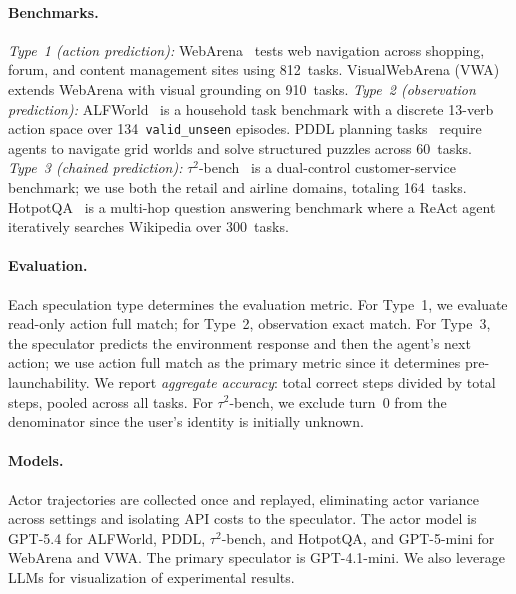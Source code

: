 \documentclass{article}
\begin{document}
\paragraph{Benchmarks.}
\emph{Type~1 (action prediction):} WebArena~\citep{zhou2024webarena} tests web navigation across shopping, forum, and content management sites using 812~tasks. VisualWebArena (VWA)~\citep{koh2024vwa} extends WebArena with visual grounding on 910~tasks. \emph{Type~2 (observation prediction):} ALFWorld~\citep{shridhar2021alfworld} is a household task benchmark with a discrete 13-verb action space over 134~\texttt{valid\_unseen} episodes. PDDL planning tasks~\citep{vallati2015ipc,ma2024agentboard} require agents to navigate grid worlds and solve structured puzzles across 60~tasks. \emph{Type~3 (chained prediction):} $\tau^{2}$-bench~\citep{barres2025tau2} is a dual-control customer-service benchmark; we use both the retail and airline domains, totaling 164~tasks. HotpotQA~\citep{yang2018hotpotqa} is a multi-hop question answering benchmark where a ReAct agent~\citep{yao2023react} iteratively searches Wikipedia over 300~tasks.

\paragraph{Evaluation.}
Each speculation type determines the evaluation metric. For Type~1, we evaluate read-only action full match; for Type~2, observation exact match. For Type~3, the speculator predicts the environment response and then the agent's next action; we use action full match as the primary metric since it determines pre-launchability. We report \emph{aggregate accuracy}: total correct steps divided by total steps, pooled across all tasks. For $\tau^{2}$-bench, we exclude turn~0 from the denominator since the user's identity is initially unknown.

\paragraph{Models.}
Actor trajectories are collected once and replayed, eliminating actor variance across settings and isolating API costs to the speculator. The actor model is GPT-5.4 for ALFWorld, PDDL, $\tau^{2}$-bench, and HotpotQA, and GPT-5-mini for WebArena and VWA. The primary speculator is GPT-4.1-mini. We also leverage LLMs for visualization of experimental results.
\end{document}
